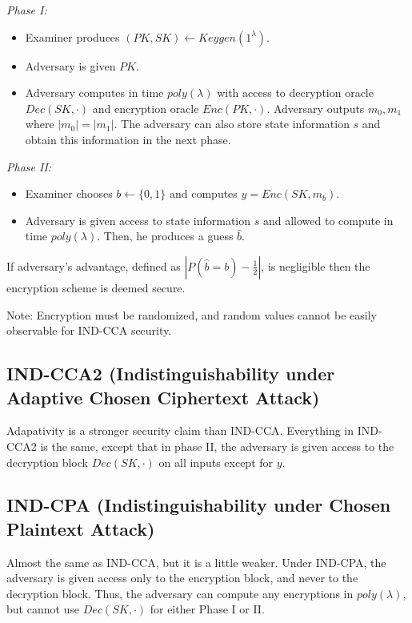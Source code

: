\documentclass[psamsfonts]{amsart}
\begin{document}
\emph{Phase I:}
\begin{itemize}
  \item Examiner produces $(PK, SK) \leftarrow Keygen(1^\lambda)$.
  \item Adversary is given $PK$.
  \item Adversary computes in time $poly(\lambda)$ with access to decryption oracle $Dec(SK, \cdot)$ and encryption oracle $Enc(PK, \cdot)$. Adversary outputs $m_0, m_1$ where $|m_0| = |m_1|$. The adversary can also store state information $s$ and obtain this information in the next phase.
\end{itemize}

\emph{Phase II:}
\begin{itemize}
  \item Examiner chooses $b \leftarrow \{0,1\}$ and computes $y = Enc(SK, m_b)$.
  \item Adversary is given access to state information $s$ and allowed to compute in time $poly(\lambda)$. Then, he produces a guess $\hat{b}$.
\end{itemize}

If adversary's advantage, defined as $|P(\hat{b} = b) - \frac{1}{2}|$, is negligible then the encryption scheme is deemed secure.

Note: Encryption must be randomized, and random values cannot be easily observable for IND-CCA security.

\subsection{IND-CCA2 (Indistinguishability under Adaptive Chosen Ciphertext Attack)}

Adapativity is a stronger security claim than IND-CCA. Everything in IND-CCA2 is the same, except that in phase II, the adversary is given access to the decryption block $Dec(SK, \cdot)$ on all inputs except for $y$.

\subsection{IND-CPA (Indistinguishability under Chosen Plaintext Attack)}

Almost the same as IND-CCA, but it is a little weaker. Under IND-CPA, the adversary is given access only to the encryption block, and never to the decryption block. Thus, the adversary can compute any encryptions in $poly(\lambda)$, but cannot use $Dec(SK, \cdot)$ for either Phase I or II.
\end{document}
